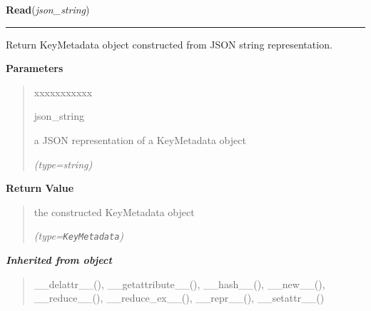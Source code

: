     \label{keyczar:keydata:KeyMetadata:Read}

    \vspace{0.5ex}

\hspace{.8\funcindent}\begin{boxedminipage}{\funcwidth}

    \raggedright \textbf{Read}(\textit{json\_string})

    \vspace{-1.5ex}

    \rule{\textwidth}{0.5\fboxrule}
\setlength{\parskip}{2ex}
    Return KeyMetadata object constructed from JSON string representation.

\setlength{\parskip}{1ex}
      \textbf{Parameters}
      \vspace{-1ex}

      \begin{quote}
        \begin{Ventry}{xxxxxxxxxxx}

          \item[json\_string]

          a JSON representation of a KeyMetadata object

            {\it (type=string)}

        \end{Ventry}

      \end{quote}

      \textbf{Return Value}
    \vspace{-1ex}

      \begin{quote}
      the constructed KeyMetadata object

      {\it (type=\texttt{KeyMetadata})}

      \end{quote}

    \end{boxedminipage}


\large{\textbf{\textit{Inherited from object}}}

\begin{quote}
\_\_delattr\_\_(), \_\_getattribute\_\_(), \_\_hash\_\_(), \_\_new\_\_(), \_\_reduce\_\_(), \_\_reduce\_ex\_\_(), \_\_repr\_\_(), \_\_setattr\_\_()
\end{quote}

